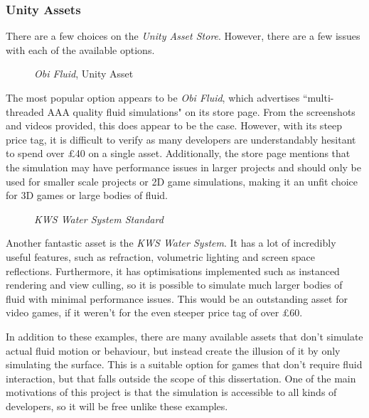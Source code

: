 \documentclass[a4paper, 12pt]{article}
\newcommand{\wideimage}[2][]{%
  \makebox[\textwidth][c]{\texttt{[image: \#2]}}%
}
\begin{document}
    \subsubsection{Unity Assets}

    There are a few choices on the \textit{Unity Asset Store}\cite{unityasset}. However, there are a few issues with each of the available options.

    \begin{figure}[H]
        \wideimage[]{obiFluid.png}
        \caption{\textit{Obi Fluid}, Unity Asset \cite{obi}}
    \end{figure}

    The most popular option appears to be \textit{Obi Fluid}, which advertises ``multi-threaded AAA quality fluid simulations" on its store page. From the screenshots and videos provided, this does appear to be the case. However, with its steep price tag, it is difficult to verify as many developers are understandably hesitant to spend over £40 on a single asset. Additionally, the store page mentions that the simulation may have performance issues in larger projects and should only be used for smaller scale projects or 2D game simulations, making it an unfit choice for 3D games or large bodies of fluid.

    \begin{figure}[H]
        \wideimage[]{KWS.png}
        \caption{\textit{KWS Water System Standard} \cite{kws}}
    \end{figure}

    Another fantastic asset is the \textit{KWS Water System}. It has a lot of incredibly useful features, such as refraction, volumetric lighting and screen space reflections. Furthermore, it has optimisations implemented such as instanced rendering and view culling, so it is possible to simulate much larger bodies of fluid with minimal performance issues. This would be an outstanding asset for video games, if it weren't for the even steeper price tag of over £60.

    In addition to these examples, there are many available assets that don't simulate actual fluid motion or behaviour, but instead create the illusion of it by only simulating the surface. This is a suitable option for games that don't require fluid interaction, but that falls outside the scope of this dissertation. One of the main motivations of this project is that the simulation is accessible to all kinds of developers, so it will be free unlike these examples.
    
\end{document}
